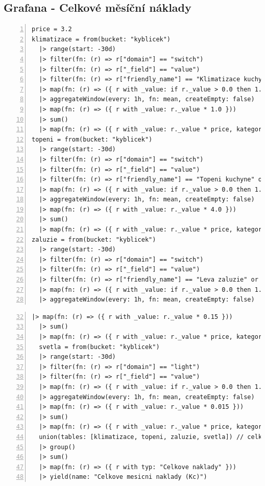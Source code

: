 \subsection{Grafana - Celkové měsíční náklady}
\begin{lstlisting}[language=flux, breaklines=true, numbers=left, numberstyle=\small, numbersep=10pt, frame=single, basicstyle=\ttfamily\small, caption={Grafana - Celkové měsíční náklady}, label={lst:grafanaCelkovyMesic}]
price = 3.2
klimatizace = from(bucket: "kyblicek")
  |> range(start: -30d)
  |> filter(fn: (r) => r["domain"] == "switch")
  |> filter(fn: (r) => r["_field"] == "value")
  |> filter(fn: (r) => r["friendly_name"] == "Klimatizace kuchyne" or r["friendly_name"] == "Klimatizace pracovna" or r["friendly_name"] == "Klimatizace u televize")
  |> map(fn: (r) => ({ r with _value: if r._value > 0.0 then 1.0 else 0.0 }))
  |> aggregateWindow(every: 1h, fn: mean, createEmpty: false)
  |> map(fn: (r) => ({ r with _value: r._value * 1.0 }))
  |> sum()
  |> map(fn: (r) => ({ r with _value: r._value * price, kategorie: "Klimatizace" }))
topeni = from(bucket: "kyblicek")
  |> range(start: -30d)
  |> filter(fn: (r) => r["domain"] == "switch")
  |> filter(fn: (r) => r["_field"] == "value")
  |> filter(fn: (r) => r["friendly_name"] == "Topeni kuchyne" or r["friendly_name"] == "Topeni pracovna" or r["friendly_name"] == "Topeni u televize")
  |> map(fn: (r) => ({ r with _value: if r._value > 0.0 then 1.0 else 0.0 }))
  |> aggregateWindow(every: 1h, fn: mean, createEmpty: false)
  |> map(fn: (r) => ({ r with _value: r._value * 4.0 }))
  |> sum()
  |> map(fn: (r) => ({ r with _value: r._value * price, kategorie: "Topeni" }))
zaluzie = from(bucket: "kyblicek")
  |> range(start: -30d)
  |> filter(fn: (r) => r["domain"] == "switch")
  |> filter(fn: (r) => r["_field"] == "value")
  |> filter(fn: (r) => r["friendly_name"] == "Leva zaluzie" or r["friendly_name"] == "Prava zaluzie")
  |> map(fn: (r) => ({ r with _value: if r._value > 0.0 then 1.0 else 0.0 }))
  |> aggregateWindow(every: 1h, fn: mean, createEmpty: false)
\end{lstlisting}
\pagebreak
\begin{lstlisting}[language=flux, breaklines=true, numbers=left, firstnumber=32, numberstyle=\small, numbersep=10pt, frame=single, basicstyle=\ttfamily\small]
  |> map(fn: (r) => ({ r with _value: r._value * 0.15 }))
  |> sum()
  |> map(fn: (r) => ({ r with _value: r._value * price, kategorie: "Zaluzie" }))
  svetla = from(bucket: "kyblicek")
  |> range(start: -30d)
  |> filter(fn: (r) => r["domain"] == "light")
  |> filter(fn: (r) => r["_field"] == "value")
  |> map(fn: (r) => ({ r with _value: if r._value > 0.0 then 1.0 else 0.0 }))
  |> aggregateWindow(every: 1h, fn: mean, createEmpty: false)
  |> map(fn: (r) => ({ r with _value: r._value * 0.015 }))
  |> sum()
  |> map(fn: (r) => ({ r with _value: r._value * price, kategorie: "Svetla" }))
  union(tables: [klimatizace, topeni, zaluzie, svetla]) // celkova sumu
  |> group()
  |> sum()
  |> map(fn: (r) => ({ r with typ: "Celkove naklady" }))
  |> yield(name: "Celkove mesicni naklady (Kc)")
\end{lstlisting}
\pagebreak
